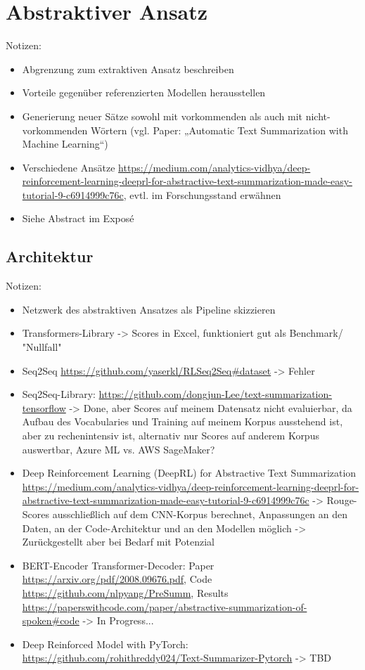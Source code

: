 \chapter{Abstraktiver Ansatz}
\thispagestyle{fancy}
\label{chap:Abstraktiver Ansatz}

Notizen:
\begin{itemize}
	\item Abgrenzung zum extraktiven Ansatz beschreiben
	\item Vorteile gegenüber referenzierten Modellen herausstellen
	\item Generierung neuer Sätze sowohl mit vorkommenden als auch mit nicht-vorkommenden Wörtern (vgl. Paper: „Automatic Text Summarization with Machine Learning“)
	\item Verschiedene Ansätze \url{https://medium.com/analytics-vidhya/deep-reinforcement-learning-deeprl-for-abstractive-text-summarization-made-easy-tutorial-9-c6914999c76c}, evtl. im Forschungsstand erwähnen
	\item Siehe Abstract im Exposé
\end{itemize}


\section{Architektur}
Notizen:
\begin{itemize}
	\item Netzwerk des abstraktiven Ansatzes als Pipeline skizzieren
	\item Transformers-Library -> Scores in Excel, funktioniert gut als Benchmark/ "Nullfall"
	\item Seq2Seq \url{https://github.com/yaserkl/RLSeq2Seq#dataset} -> Fehler
	\item Seq2Seq-Library: \url{https://github.com/dongjun-Lee/text-summarization-tensorflow} -> Done, aber Scores auf meinem Datensatz nicht evaluierbar, da Aufbau des Vocabularies und Training auf meinem Korpus ausstehend ist, aber zu rechenintensiv ist, alternativ nur Scores auf anderem Korpus auswertbar, Azure ML vs. AWS SageMaker?
	\item Deep Reinforcement Learning (DeepRL) for Abstractive Text Summarization \url{https://medium.com/analytics-vidhya/deep-reinforcement-learning-deeprl-for-abstractive-text-summarization-made-easy-tutorial-9-c6914999c76c} -> Rouge-Scores ausschließlich auf dem CNN-Korpus berechnet, Anpassungen an den Daten, an der Code-Architektur und an den Modellen möglich -> Zurückgestellt aber bei Bedarf mit Potenzial
	\item BERT-Encoder Transformer-Decoder: Paper \url{https://arxiv.org/pdf/2008.09676.pdf}, Code \url{https://github.com/nlpyang/PreSumm}, Results \url{https://paperswithcode.com/paper/abstractive-summarization-of-spoken#code} -> In Progress...
	\item Deep Reinforced Model with PyTorch: \url{https://github.com/rohithreddy024/Text-Summarizer-Pytorch} -> TBD
\end{itemize}


